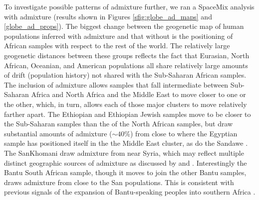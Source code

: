 \documentclass[12pt]{article}
\begin{document}
To investigate possible patterns of admixture further, we ran a SpaceMix analysis with admixture (results shown in Figures \ref{sfig:globe_ad_maps} and \ref{globe_ad_props}). The biggest change between the geogenetic map of human populations inferred with admixture and that without is the positioning of African samples with respect to the rest of the world.  The relatively large geogenetic distances between these groups reflects the fact that Eurasian, North African, Oceanian, and American populations all share relatively large amounts of drift (population history) not shared with the Sub-Saharan African samples. The inclusion of admixture allows samples that fall intermediate between Sub-Saharan Africa and North Africa and the Middle East to move closer to one or the other, which, in turn, allows each of those major clusters to move relatively farther apart.  The Ethiopian and Ethiopian Jewish samples move to be closer to the Sub-Saharan samples than the of the North African samples, but draw substantial amounts of admixture ($\sim 40\%$) from close to where the Egyptian sample has positioned itself in the the Middle East cluster, as do the Sandawe \citep{hodgson_early_2014,Pickrell:12}. The SanKhomani draw admixture from near Syria, which may reflect multiple distinct geographic sources of admixture as discussed by \citep{Hellenthal} and \citep{Pickrell:14}. 
Interestingly the Bantu South African sample, though it moves to join the other Bantu samples, draws admixture from close to the San populations. This is consistent with previous signals of the expansion of Bantu-speaking peoples into southern Africa  \citep{Pickrell:12,Jakobsson_genomic_2012,Pickrell:14,Hellenthal}. 
\end{document}
